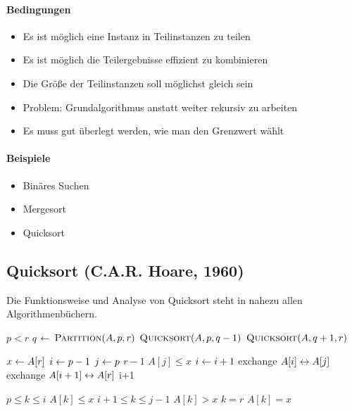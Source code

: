 \documentclass[a4paper,twoside,DIV15,BCOR12mm]{scrbook}
\begin{document}
\paragraph{Bedingungen}
\begin{itemize}
	\item Es ist möglich eine Instanz in Teilinstanzen zu teilen
	\item Es ist möglich die Teilergebnisse effizient zu kombinieren
	\item Die Größe der Teilinstanzen soll möglichst gleich sein
	\item Problem: Grundalgorithmus anstatt weiter rekursiv zu arbeiten
	\item Es muss gut überlegt werden, wie man den Grenzwert wählt
\end{itemize}

\paragraph{Beispiele}
\begin{itemize}
	\item Binäres Suchen
	\item Mergesort
	\item Quicksort
\end{itemize}

\subsection{Quicksort (C.A.R. Hoare, 1960)}
Die Funktionsweise und Analyse von Quicksort steht in nahezu allen Algorithmenbüchern.

\begin{codebox}
\li	\If $p<r$
\li		\Then 
				$q$ $\leftarrow$ $\textnormal{\scshape Partition} (A,p,r)$
\li			$\textnormal{\scshape Quicksort}(A,p,q-1)$
\li			$\textnormal{\scshape Quicksort}(A,q+1,r)$
		\End
\end{codebox}

\begin{codebox}
\li $x \leftarrow A[r]$
\li $i \leftarrow p-1$
\li \For $j \leftarrow p$ \To $r-1$
\li		\Do
				\If $A[j] \leq x$
\li				\Then 
						$i \leftarrow i+1$
\li					exchange $A[i] \leftrightarrow A[j]$
				\End
		\End
\li	exchange $A[i+1] \leftrightarrow A[r]$
\li	\Return i+1
\end{codebox}

\begin{codebox}
\li \If $p \leq k \leq i$
\li		\Then $A[k] \leq x$
		\End
\li \If $i+1 \leq k \leq j-1$
\li		\Then $A[k] > x$
		\End
\li \If $k=r$
\li		\Then $A[k]=x$
		\End
\end{codebox}
\end{document}
